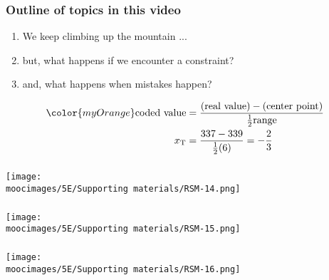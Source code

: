 \documentclass[handout,11pt,aspectratio=169,mathserif]{beamer}
\begin{document}

\begin{frame}\frametitle{Outline of topics in this video}
	\begin{enumerate}
		\item	We keep climbing up the mountain ... \pause
		\item	but, what happens if we encounter a constraint? \pause
		\item	and, what happens when mistakes happen?\pause
	\end{enumerate}
	
	\begin{align*}
		\color{myOrange}\text{coded value} &= \dfrac{(\text{real value}) - (\text{center point})}{\tfrac{1}{2}\text{range}} \\
		x_\text{T} &= \dfrac{337 - 339}{\tfrac{1}{2}(6)} = -\dfrac{2}{3}
	\end{align*}
\end{frame}

\begin{frame}\frametitle{}
	\centerline{\texttt{[image: \\moocimages/5E/Supporting materials/RSM-14.png]}}
\end{frame}

\begin{frame}\frametitle{}
	\centerline{\texttt{[image: \\moocimages/5E/Supporting materials/RSM-15.png]}}
\end{frame}

\begin{frame}\frametitle{}
	\centerline{\texttt{[image: \\moocimages/5E/Supporting materials/RSM-16.png]}}
\end{frame}
\end{document}
